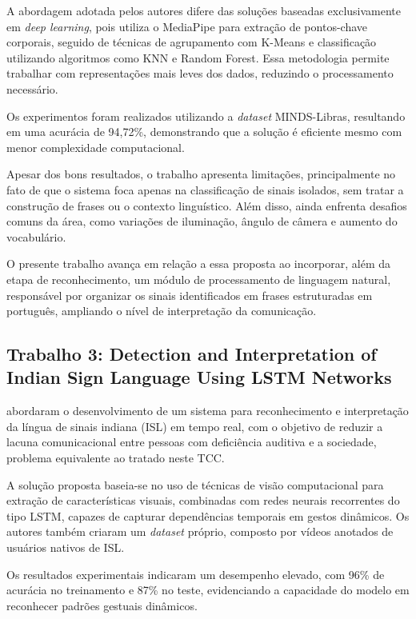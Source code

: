 \documentclass[
    12pt,                %
    openright,           %
    oneside,             %
    a4paper,             %
    english,             %
    brazil               %
]{abntex2}
\begin{document}
A abordagem adotada pelos autores difere das soluções baseadas exclusivamente em \textit{deep learning}, pois utiliza o MediaPipe para extração de pontos-chave corporais, seguido de técnicas de agrupamento com K-Means e classificação utilizando algoritmos como KNN e Random Forest. Essa metodologia permite trabalhar com representações mais leves dos dados, reduzindo o processamento necessário.

Os experimentos foram realizados utilizando a \textit{dataset} MINDS-Libras, resultando em uma acurácia de 94,72\%, demonstrando que a solução é eficiente mesmo com menor complexidade computacional.

Apesar dos bons resultados, o trabalho apresenta limitações, principalmente no fato de que o sistema foca apenas na classificação de sinais isolados, sem tratar a construção de frases ou o contexto linguístico. Além disso, ainda enfrenta desafios comuns da área, como variações de iluminação, ângulo de câmera e aumento do vocabulário.

O presente trabalho avança em relação a essa proposta ao incorporar, além da etapa de reconhecimento, um módulo de processamento de linguagem natural, responsável por organizar os sinais identificados em frases estruturadas em português, ampliando o nível de interpretação da comunicação.

\subsection{Trabalho 3: Detection and Interpretation of Indian Sign Language Using LSTM Networks}

 abordaram o desenvolvimento de um sistema para reconhecimento e interpretação da língua de sinais indiana (ISL) em tempo real, com o objetivo de reduzir a lacuna comunicacional entre pessoas com deficiência auditiva e a sociedade, problema equivalente ao tratado neste TCC.

A solução proposta baseia-se no uso de técnicas de visão computacional para extração de características visuais, combinadas com redes neurais recorrentes do tipo LSTM, capazes de capturar dependências temporais em gestos dinâmicos. Os autores também criaram um \textit{dataset} próprio, composto por vídeos anotados de usuários nativos de ISL.

Os resultados experimentais indicaram um desempenho elevado, com 96\% de acurácia no treinamento e 87\% no teste, evidenciando a capacidade do modelo em reconhecer padrões gestuais dinâmicos.
\end{document}

